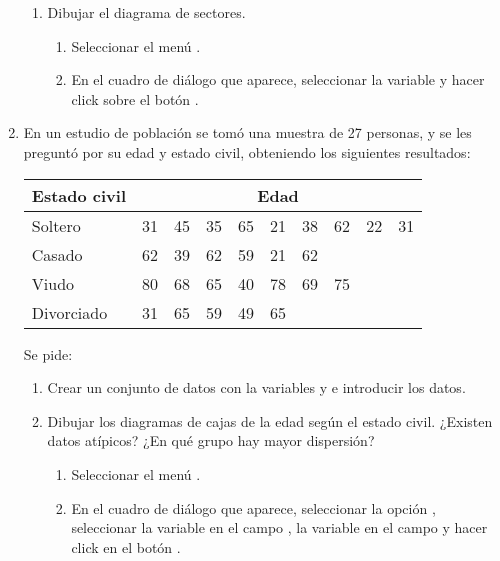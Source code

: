 \begin{enumerate}[leftmargin=*]
\begin{enumerate}
\item Dibujar el diagrama de sectores.
\begin{indicacion}{
\begin{enumerate}
\item Seleccionar el menú .
\item En el cuadro de diálogo que aparece, seleccionar la variable  y hacer click sobre el
botón .
\end{enumerate}}
\end{indicacion}
\end{enumerate}

\item  En un estudio de población se tomó una muestra de 27 personas, y se les preguntó por su edad y estado civil,
obteniendo los siguientes resultados:
\begin{center}
\begin{tabular}{|l|rrrrrrrrr|}
\hline
Estado civil & \multicolumn{9}{c|}{Edad}\\
\hline
Soltero    & 31 & 45 & 35 & 65 & 21 & 38 & 62 & 22 & 31 \\
Casado     & 62 & 39 & 62 & 59 & 21 & 62 &    &    &    \\
Viudo      & 80 & 68 & 65 & 40 & 78 & 69 & 75 &    &    \\
Divorciado & 31 & 65 & 59 & 49 & 65 &    &    &    &    \\
\hline
\end{tabular}
\end{center}

Se pide:
\begin{enumerate}
\item Crear un conjunto de datos con la variables  y  e introducir los datos.
\item Dibujar los diagramas de cajas de la edad según el estado civil. ¿Existen datos atípicos? ¿En qué grupo hay mayor
dispersión?
\begin{indicacion}{
\begin{enumerate}
\item Seleccionar el menú .
\item En el cuadro de diálogo que aparece, seleccionar la opción , seleccionar la variable  en el campo , la variable  en el campo  y hacer click en el botón .
\end{enumerate}}
\end{indicacion}
\end{enumerate}

\end{enumerate}


